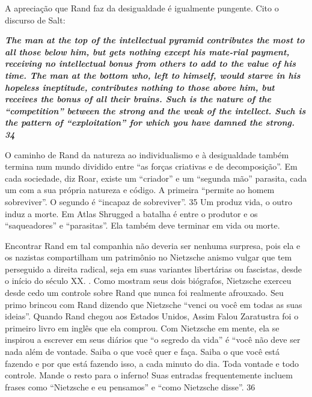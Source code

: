  
\par
 
A apreciação que Rand faz da desigualdade é igualmente pungente. Cito o discurso de Salt:
 
\par
 

 \textbf{\textit{The man at the top of the intellectual pyramid contributes the most to all those below him, but gets nothing except his mate-rial payment, receiving no intellectual bonus from others to add to the value of his time. The man at the bottom who, left to himself, would starve in his hopeless ineptitude, contributes nothing to those above him, but receives the bonus of all their brains. Such is the nature of the “competition” between the strong and the weak of the intellect. Such is the pattern of “exploitation” for which you have damned the strong. {{\color{blue} 34} } } }  
 
 
\par
 
O caminho de Rand da natureza ao individualismo e à desigualdade também termina num mundo dividido entre “as forças criativas e de decomposição”. Em cada sociedade, diz Roar, existe um “criador” e um “segunda mão” parasita, cada um com a sua própria natureza e código. A primeira “permite ao homem sobreviver”. O segundo é “incapaz de sobreviver”.
 {\color{blue} 35}  
Um produz vida, o outro induz a morte. Em Atlas Shrugged a batalha é entre o produtor e os “saqueadores” e “parasitas”. Ela também deve terminar em vida ou morte.
 
\par
 
Encontrar Rand em tal companhia não deveria ser nenhuma surpresa, pois ela e os nazistas compartilham um patrimônio no Nietzsche anismo vulgar que tem perseguido a direita radical, seja em suas variantes libertárias ou fascistas, desde o início do século XX. . Como mostram seus dois biógrafos, Nietzsche exerceu desde cedo um controle sobre Rand que nunca foi realmente afrouxado. Seu primo brincou com Rand dizendo que Nietzsche “venci ou você em todas as suas ideias”. Quando Rand chegou aos Estados Unidos, Assim Falou Zaratustra foi o primeiro livro em inglês que ela comprou. Com Nietzsche em mente, ela se inspirou a escrever em seus diários que “o segredo da vida” é “você não deve ser nada além de vontade. Saiba o que você quer e faça. Saiba o que você está fazendo e por que está fazendo isso, a cada minuto do dia. Toda vontade e todo controle. Mande o resto para o inferno! Suas entradas frequentemente incluem frases como “Nietzsche e eu pensamos” e “como Nietzsche disse”.
 {\color{blue} 36}  

